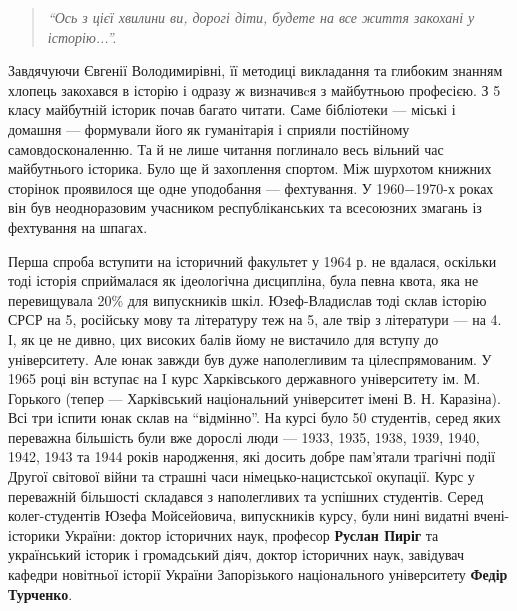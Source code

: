 \begin{quote}
\em\enquote{Ось з цієї хвилини ви, дорогі діти, будете на все життя
закохані у історію...}.
\end{quote}

Завдячуючи Євгенії Володимирівні, її методиці викладання
та глибоким знанням хлопець закохався в історію і одразу ж визначивcя з
майбутньою професією. З 5 класу майбутній історик почав багато читати. Саме
бібліотеки — міські і домашня — формували його як гуманітарія і сприяли
постійному самовдосконаленню. Та й не лише читання поглинало весь вільний час
майбутнього історика. Було ще й захоплення спортом. Між шурхотом книжних
сторінок проявилося ще одне уподобання — фехтування. У 1960−1970-х роках він
був неодноразовим учасником республіканських та всесоюзних змагань із
фехтування на шпагах.



Перша спроба вступити на історичний факультет у 1964 р. не вдалася, оскільки
тоді історія сприймалася як ідеологічна дисципліна, була певна квота, яка не
перевищувала 20\% для випускників шкіл. Юзеф-Владислав тоді склав історію СРСР
на 5, російську мову та літературу теж на 5, але твір з літератури — на 4. І,
як це не дивно, цих високих балів йому не вистачило для вступу до університету.
Але юнак завжди був дуже наполегливим та цілеспрямованим. У 1965 році він
вступає на I курс Харківського державного університету ім. М. Горького (тепер —
Харківський національний університет імені В. Н. Каразіна). Всі три іспити юнак
склав на \enquote{відмінно}. На курсі було 50 студентів, серед яких переважна більшість
були вже дорослі люди — 1933, 1935, 1938, 1939, 1940, 1942, 1943 та 1944 років
народження, які досить добре пам'ятали трагічні події Другої світової війни та
страшні часи німецько-нацистської окупації. Курс у переважній більшості
складався з наполегливих та успішних студентів. Серед колег-студентів Юзефа
Мойсейовича, випускників курсу, були нині видатні вчені-історики України:
доктор історичних наук, професор \textbf{Руслан Пиріг} та український історик і
громадський діяч, доктор історичних наук, завідувач кафедри новітньої історії
України Запорізького національного університету \textbf{Федір Турченко}.


